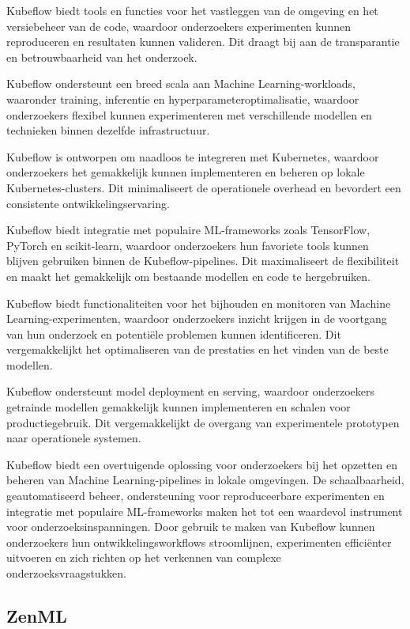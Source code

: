 Kubeflow biedt tools en functies voor het vastleggen van de omgeving en het versiebeheer van de code, waardoor onderzoekers experimenten kunnen reproduceren en resultaten kunnen valideren. Dit draagt bij aan de transparantie en betrouwbaarheid van het onderzoek.

Kubeflow ondersteunt een breed scala aan Machine Learning-workloads, waaronder training, inferentie en hyperparameteroptimalisatie, waardoor onderzoekers flexibel kunnen experimenteren met verschillende modellen en technieken binnen dezelfde infrastructuur.

Kubeflow is ontworpen om naadloos te integreren met Kubernetes, waardoor onderzoekers het gemakkelijk kunnen implementeren en beheren op lokale Kubernetes-clusters. Dit minimaliseert de operationele overhead en bevordert een consistente ontwikkelingservaring.

Kubeflow biedt integratie met populaire ML-frameworks zoals TensorFlow, PyTorch en scikit-learn, waardoor onderzoekers hun favoriete tools kunnen blijven gebruiken binnen de Kubeflow-pipelines. Dit maximaliseert de flexibiliteit en maakt het gemakkelijk om bestaande modellen en code te hergebruiken.

Kubeflow biedt functionaliteiten voor het bijhouden en monitoren van Machine Learning-experimenten, waardoor onderzoekers inzicht krijgen in de voortgang van hun onderzoek en potentiële problemen kunnen identificeren. Dit vergemakkelijkt het optimaliseren van de prestaties en het vinden van de beste modellen.

Kubeflow ondersteunt model deployment en serving, waardoor onderzoekers getrainde modellen gemakkelijk kunnen implementeren en schalen voor productiegebruik. Dit vergemakkelijkt de overgang van experimentele prototypen naar operationele systemen.

Kubeflow biedt een overtuigende oplossing voor onderzoekers bij het opzetten en beheren van Machine Learning-pipelines in lokale omgevingen. De schaalbaarheid, geautomatiseerd beheer, ondersteuning voor reproduceerbare experimenten en integratie met populaire ML-frameworks maken het tot een waardevol instrument voor onderzoeksinspanningen. Door gebruik te maken van Kubeflow kunnen onderzoekers hun ontwikkelingsworkflows stroomlijnen, experimenten efficiënter uitvoeren en zich richten op het verkennen van complexe onderzoeksvraagstukken.
\subsection{ZenML}

